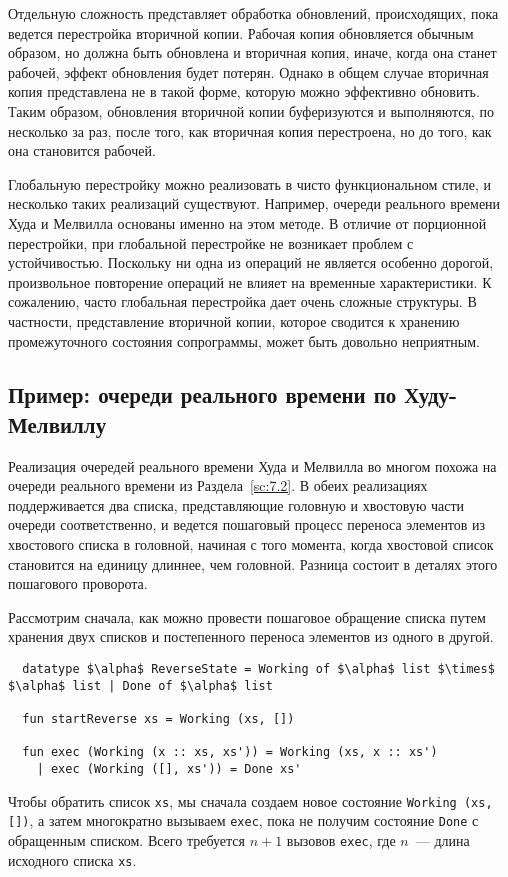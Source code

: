 Отдельную сложность представляет обработка обновлений, происходящих,
пока ведется перестройка вторичной копии. Рабочая копия обновляется
обычным образом, но должна быть обновлена и вторичная копия, иначе,
когда она станет рабочей, эффект обновления будет потерян. Однако в
общем случае вторичная копия представлена не в такой форме, которую
можно эффективно обновить. Таким образом, обновления вторичной копии
буферизуются и выполняются, по несколько за раз, после того, как
вторичная копия перестроена, но до того, как она становится рабочей.

Глобальную перестройку можно реализовать в чисто функциональном стиле,
и несколько таких реализаций существуют. Например, очереди реального
времени Худа и Мелвилла \cite{HoodMelville1981} основаны именно на
этом методе. В отличие от порционной перестройки, при глобальной
перестройке не возникает проблем с устойчивостью. Поскольку ни одна из
операций не является особенно дорогой, произвольное повторение
операций не влияет на временные характеристики.  К сожалению, часто
глобальная перестройка дает очень сложные структуры. В частности,
представление вторичной копии, которое сводится к хранению
промежуточного состояния сопрограммы, может быть довольно неприятным.

\subsection{Пример: очереди реального времени по Худу-Мелвиллу}
\label{sc:8.2.1}

Реализация очередей реального времени Худа и Мелвилла
\cite{HoodMelville1981} во многом похожа на очереди реального времени
из Раздела~\ref{sc:7.2}. В обеих реализациях поддерживается два
списка, представляющие головную и хвостовую части очереди
соответственно, и ведется пошаговый процесс переноса элементов из
хвостового списка в головной, начиная с того момента, когда хвостовой
список становится на единицу длиннее, чем головной.  Разница состоит в
деталях этого пошагового проворота.

Рассмотрим сначала, как можно провести пошаговое обращение списка
путем хранения двух списков и постепенного переноса элементов из
одного в другой.
\begin{lstlisting}
  datatype $\alpha$ ReverseState = Working of $\alpha$ list $\times$ $\alpha$ list | Done of $\alpha$ list

  fun startReverse xs = Working (xs, [])

  fun exec (Working (x :: xs, xs')) = Working (xs, x :: xs')
    | exec (Working ([], xs')) = Done xs'
\end{lstlisting}
Чтобы обратить список \lstinline!xs!, мы сначала создаем новое
состояние \lstinline!Working (xs, [])!, а затем многократно вызываем
\lstinline!exec!, пока не получим состояние \lstinline!Done! с
обращенным списком. Всего требуется $n + 1$ вызовов \lstinline!exec!,
где $n$~--- длина исходного списка \lstinline!xs!.

